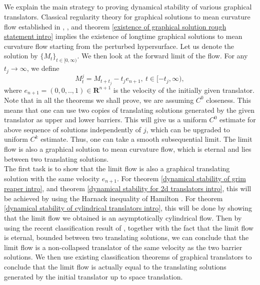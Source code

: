 \documentclass[pdflatex,sn-mathphys-num]{sn-jnl}%
\begin{document}
\subsection*{}\label{generalstrategy} We explain the main strategy to proving dynamical stability of various graphical translators. Classical regularity theory for graphical solutions to mean curvature flow established in \cite{eckerhuisken}, \cite{Ecker1991InteriorEF}, and theorem \ref{existence of graphical solution rough statement intro} implies the existence of longtime graphical solutions to mean curvature flow starting from the perturbed hypersurface. Let us denote the solution by $\{M_t\}_{t \in [0, \infty)}$. We then look at the forward limit of the flow. For any $t_j \to \infty$, we define
\begin{equation}
    M^j_t = M_{t + t_j} - t_je_{n+1}, \ t\in [-t_j, \infty),
\end{equation}
where $e_{n+1} = (0,0,..,1) \in \mathbf{R}^{n+1}$ is the velocity of the initially given translator. Note that in all the theorems we shall prove, we are assuming $C^0$ closeness. This means that one can use two copies of translating solutions generated by the given translator as upper and lower barriers. This will give us a uniform $C^0$ estimate for above sequence of solutions independently of $j$, which can be upgraded to uniform $C^k$ estimate. Thus, one can take a smooth subsequential limit. The limit flow is also a graphical solution to mean curvature flow, which is eternal and lies between two translating solutions.\\

The first task is to show that the limit flow is also a graphical translating solution with the same velocity $e_{n+1}$. For theorem \ref{dynamical stability of grim reaper intro}, and theorem \ref{dynamical stability for 2d translators intro}, this will be achieved by using the Harnack inequality of Hamilton \cite{Hamilton1995HarnackEF}. For theorem \ref{dynamical stability of cylindrical translators intro}, this will be done by showing that the limit flow we obtained is an asymptotically cylindrical flow. Then by using the recent  classification result of \cite{Bamler2025-thclassification}, together with the fact that the limit flow is eternal, bounded between two translating solutions, we can conclude that the limit flow is a non-collapsed translator of the same velocity as the two barrier solutions. We then use existing classification theorems of graphical translators to conclude that the limit flow is actually equal to the translating solutions generated by the initial translator up to space translation. \\
\end{document}
